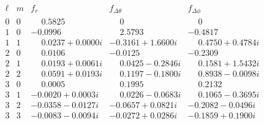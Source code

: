 \documentclass[
    prd, twocolumn, nofootinbib, amsmath, amssymb,
    aps, floatfix, preprintnumbers
]{revtex4-2}
\begin{document}
\begin{table}
    {\scriptsize
    \begin{equation*}
    \begin{array}{lr|c|c|c}
        \ell & m & f_r & f_{\Delta\theta} & f_{\Delta\phi} \\
        \hline
        0 & 0 &
             \phantom{-}0.5825\phantom{ + 0.0000ii} &
             \phantom{-}0\phantom{.0000}\phantom{ + 0.0000ii} &
             \phantom{-}0\phantom{.0000}\phantom{ + 0.0000ii} \\
        1 & 0 &
             -0.0996\phantom{ + 0.0000ii} &
             \phantom{-}2.5793\phantom{ + 0.0000ii} &
             -0.4817\phantom{ + 0.0000ii} \\
        1 & 1 &
             \phantom{-}0.0237 + 0.0000i &
             -0.3161 + 1.6600i &
             \phantom{-}0.4750 + 0.4784i \\
        2 & 0 &
             \phantom{-}0.0106\phantom{ + 0.0000ii} &
             -0.0125\phantom{ + 0.0000ii} &
             -0.2309\phantom{ + 0.0000ii} \\
        2 & 1 &
             \phantom{-}0.0193 + 0.0061i &
             \phantom{-}0.0425 - 0.2846i &
             \phantom{-}0.1581 + 1.5432i \\
        2 & 2 &
             \phantom{-}0.0591 + 0.0193i &
             \phantom{-}0.1197 - 0.1800i &
             \phantom{-}0.8938 - 0.0098i \\
        3 & 0 &
             \phantom{-}0.0005\phantom{ + 0.0000ii} &
             \phantom{-}0.1995\phantom{ + 0.0000ii} &
             \phantom{-}0.2132\phantom{ + 0.0000ii} \\
        3 & 1 &
             -0.0020 + 0.0003i &
             \phantom{-}0.0226 - 0.0683i &
             \phantom{-}0.1065 - 0.3695i \\
        3 & 2 &
             -0.0358 - 0.0127i &
             -0.0657 + 0.0821i &
             -0.2082 - 0.0496i \\
        3 & 3 &
             -0.0083 - 0.0094i &
             -0.0272 + 0.0286i &
             -0.1859 + 0.1900i
    \end{array}
    \end{equation*}
    }
    \caption{Multipole coefficients of the cow surface $\partial\mathcal C$ through the quadrupole computed via the harmonic map method.}
    \label{tab:harmonic-map-components}
\end{table}
\end{document}
